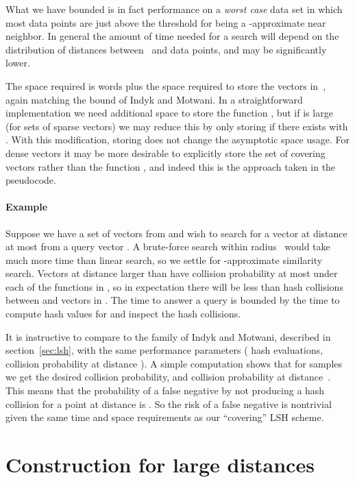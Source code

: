 \documentclass[prodmode,acmtalg]{acmsmall}
\begin{document}
What we have bounded is in fact performance on a \emph{worst case} data set in which most data points are just above the threshold for being a -approximate near neighbor.
In general the amount of time needed for a search will depend on the distribution of distances between~ and data points, and may be significantly lower.

The space required is  words plus the space required to store the vectors in~, again matching the bound of Indyk and Motwani.
In a straightforward implementation we need additional space  to store the function , but if  is large (for sets of sparse vectors) we may reduce this by only storing  if there exists  with .
With this modification, storing  does not change the asymptotic space usage.
For dense vectors it may be more desirable to explicitly store the set of covering vectors  rather than the function , and indeed this is the approach taken in the pseudocode.


\medskip

\paragraph{Example} Suppose we have a set  of  vectors from  and wish to search for a vector at distance at most  from a query vector .
A brute-force search within radius~ would take much more time than linear search, so we settle for -approximate similarity search.
Vectors at distance larger than  have collision probability at most  under each of the  functions in , so in expectation there will be less than  hash collisions between  and vectors in . 
The time to answer a query is bounded by the time to compute  hash values for  and inspect the hash collisions.

It is instructive to compare to the family  of Indyk and Motwani, described in section~\ref{sec:lsh}, with the same performance parameters ( hash evaluations, collision probability  at distance ).
A simple computation shows that for  samples we get the desired collision probability, and collision probability  at distance~.
This means that the probability of a false negative by not producing a hash collision for a point at distance  is .
So the risk of a false negative is nontrivial given the same time and space requirements as our ``covering'' LSH scheme. 







\section{Construction for large distances}\label{sec:large}
\end{document}
